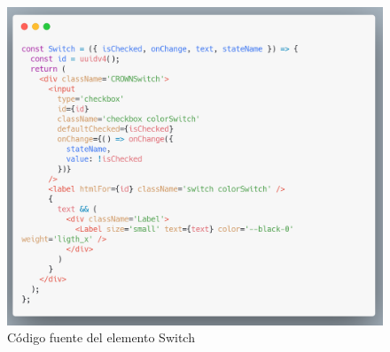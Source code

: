     \begin{figure}[H]
    \includegraphics[width=1\textwidth]{./Imagenes/8.32.png}
    \caption[Código fuente del elemento Switch]{Código fuente del elemento Switch}
    \end{figure}
\clearpage


